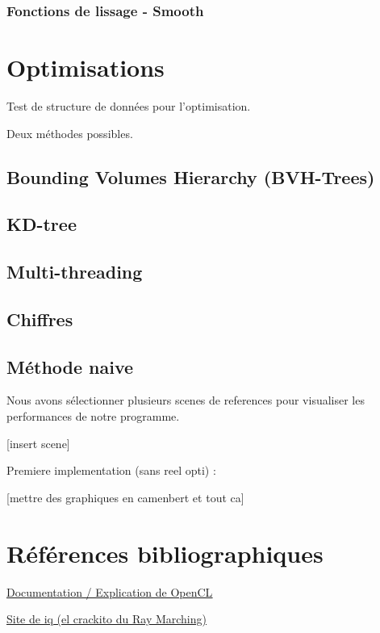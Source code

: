 \documentclass{article}
\begin{document}
\subsubsection{Fonctions de lissage - Smooth}

\section{Optimisations}

Test de structure de données pour l'optimisation.

Deux méthodes possibles.

\subsection{Bounding Volumes Hierarchy (BVH-Trees)}


\subsection{KD-tree}

\subsection{Multi-threading}


\subsection{Chiffres}

\subsection{Méthode naive}
Nous avons sélectionner plusieurs scenes de references pour visualiser les performances de notre programme.

[insert scene]

Premiere implementation (sans reel opti) : 

[mettre des graphiques en camenbert et tout ca]

\section{Références bibliographiques}

\underline{\href{https://ieeexplore-ieee-org.gorgone.univ-toulouse.fr/document/5457293}{Documentation / Explication de OpenCL}}
\smallskip 

\underline{\href{https://iquilezles.org/}{Site de iq (el crackito du Ray Marching)}}
\end{document}

